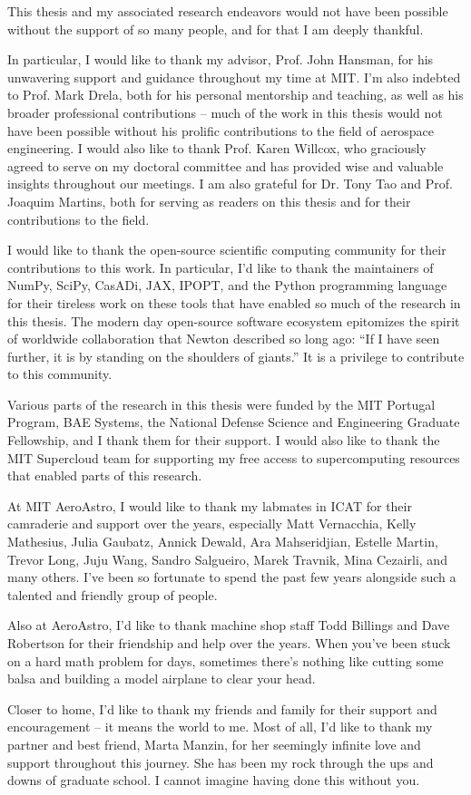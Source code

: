 This thesis and my associated research endeavors would not have been possible without the support of so many people, and for that I am deeply thankful.

In particular, I would like to thank my advisor, Prof. John Hansman, for his unwavering support and guidance throughout my time at MIT. I'm also indebted to Prof. Mark Drela, both for his personal mentorship and teaching, as well as his broader professional contributions -- much of the work in this thesis would not have been possible without his prolific contributions to the field of aerospace engineering. I would also like to thank Prof. Karen Willcox, who graciously agreed to serve on my doctoral committee and has provided wise and valuable insights throughout our meetings. I am also grateful for Dr. Tony Tao and Prof. Joaquim Martins, both for serving as readers on this thesis and for their contributions to the field.

I would like to thank the open-source scientific computing community for their contributions to this work. In particular, I'd like to thank the maintainers of NumPy, SciPy, CasADi, JAX, IPOPT, and the Python programming language for their tireless work on these tools that have enabled so much of the research in this thesis. The modern day open-source software ecosystem epitomizes the spirit of worldwide collaboration that Newton described so long ago: ``If I have seen further, it is by standing on the shoulders of giants.'' It is a privilege to contribute to this community.

Various parts of the research in this thesis were funded by the MIT Portugal Program, BAE Systems, the National Defense Science and Engineering Graduate Fellowship, and I thank them for their support. I would also like to thank the MIT Supercloud team for supporting my free access to supercomputing resources that enabled parts of this research.

At MIT AeroAstro, I would like to thank my labmates in ICAT for their camraderie and support over the years, especially Matt Vernacchia, Kelly Mathesius, Julia Gaubatz, Annick Dewald, Ara Mahseridjian, Estelle Martin, Trevor Long, Juju Wang, Sandro Salgueiro, Marek Travnik, Mina Cezairli, and many others. I've been so fortunate to spend the past few years alongside such a talented and friendly group of people.

Also at AeroAstro, I'd like to thank machine shop staff Todd Billings and Dave Robertson for their friendship and help over the years. When you've been stuck on a hard math problem for days, sometimes there's nothing like cutting some balsa and building a model airplane to clear your head.

Closer to home, I'd like to thank my friends and family for their support and encouragement -- it means the world to me. Most of all, I'd like to thank my partner and best friend, Marta Manzin, for her seemingly infinite love and support throughout this journey. She has been my rock through the ups and downs of graduate school. I cannot imagine having done this without you.